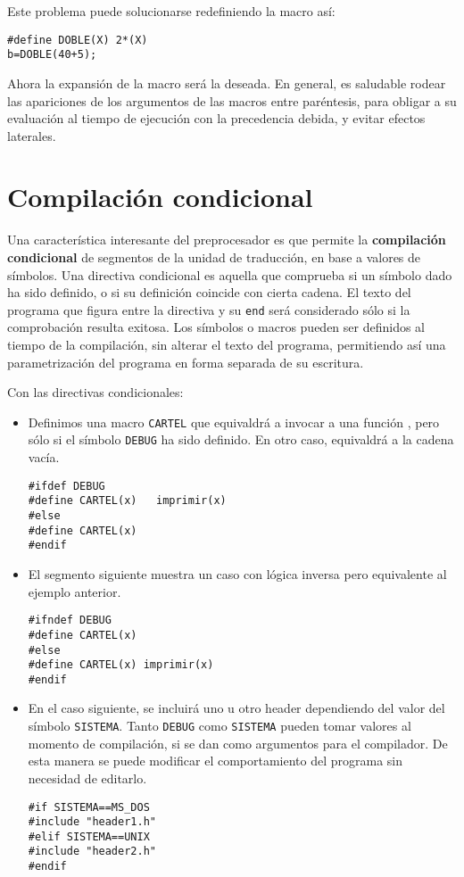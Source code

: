Este problema puede solucionarse redefiniendo la macro así:
\begin{lstlisting}
#define DOBLE(X) 2*(X)
b=DOBLE(40+5);
\end{lstlisting}
Ahora la expansión de la macro será la deseada. En general, es saludable rodear las apariciones de los
argumentos de las macros entre paréntesis, para obligar a su evaluación al tiempo de ejecución con la
precedencia debida, y evitar efectos laterales.


\section{Compilación condicional}

Una característica interesante del preprocesador es que permite la \textbf{compilación condicional} de segmentos de la unidad de traducción, en base a valores de símbolos. Una directiva condicional es aquella que comprueba si un símbolo dado ha sido definido, o si su definición coincide con cierta cadena. El texto del programa que figura entre la directiva y su \lstinline{end} será considerado sólo si la comprobación resulta exitosa. Los símbolos o macros pueden ser definidos al tiempo de la compilación, sin alterar el texto del programa, permitiendo así una parametrización del programa en forma separada de su escritura.

\begin{ejemplo}
Con las directivas condicionales:
\begin{itemize}
	\item Definimos una macro \lstinline{CARTEL} que equivaldrá a invocar a una función ,
pero sólo si el símbolo \lstinline{DEBUG} ha sido definido. En otro caso, equivaldrá a la cadena vacía. 
\begin{lstlisting}
#ifdef DEBUG
#define CARTEL(x)	imprimir(x)
#else
#define CARTEL(x)
#endif
\end{lstlisting}
\item El segmento siguiente muestra un caso con lógica inversa pero equivalente al ejemplo anterior.
\begin{lstlisting}
#ifndef DEBUG
#define CARTEL(x)
#else
#define CARTEL(x) imprimir(x)
#endif
\end{lstlisting}
\item En el caso siguiente, se incluirá uno u otro header dependiendo del valor del símbolo \lstinline{SISTEMA}. Tanto
\lstinline{DEBUG} como \lstinline{SISTEMA} pueden tomar valores al momento de compilación, si se dan como
argumentos para el compilador. De esta manera se puede modificar el comportamiento del programa
sin necesidad de editarlo.

\begin{lstlisting}
#if SISTEMA==MS_DOS
#include "header1.h"
#elif SISTEMA==UNIX
#include "header2.h"
#endif
\end{lstlisting}

\end{itemize}

\end{ejemplo}



